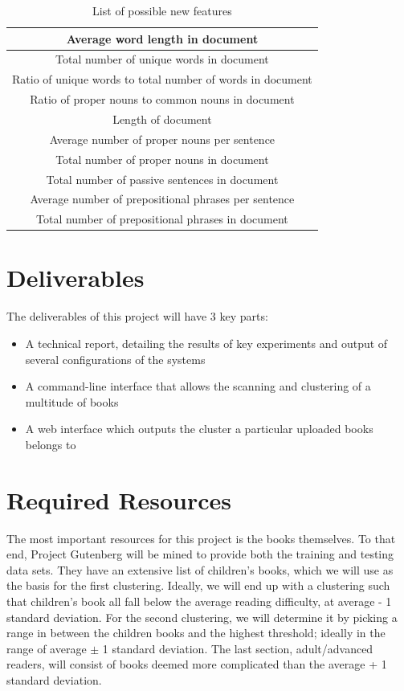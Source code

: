 \documentclass[]{article}
\begin{document}
\begin{table}[!htbp]
	\begin{center}
		\begin{tabular}{| c |} \hline
			Average word length in document \\ \hline
			Total number of unique words in document\\ \hline
			Ratio of unique words to total number of words in document \\ \hline
			Ratio of proper nouns to common nouns in document \\ \hline
			Length of document \\ \hline
			Average number of proper nouns per sentence \\ \hline
			Total number of proper nouns in document \\ \hline
			Total number of passive sentences in document \\ \hline
			Average number of prepositional phrases per sentence \\ \hline
			Total number of prepositional phrases in document \\ \hline
			
		\end{tabular}
	\end{center}
	\caption{List of possible new features}
	\label{table:features2}
\end{table}

\section{Deliverables}

The deliverables of this project will have 3 key parts:
\begin{itemize}
	\item A technical report, detailing the results of key experiments and output of several configurations of the systems
	\item A command-line interface that allows the scanning and clustering of a multitude of books
	\item A web interface which outputs the cluster a particular uploaded books belongs to
\end{itemize}

\section{Required Resources}

The most important resources for this project is the books themselves.
To that end, Project Gutenberg will be mined to provide both the training and testing data sets.
They have an extensive list of children's books, which we will use as the basis for the first clustering.
Ideally, we will end up with a clustering such that children's book all fall below the average reading difficulty, at average - 1 standard deviation.
For the second clustering, we will determine it by picking a range in between the children books and the highest threshold; ideally in the range of average $\pm$ 1 standard deviation.
The last section, adult/advanced readers, will consist of books deemed more complicated than the average + 1 standard deviation.
\end{document}
